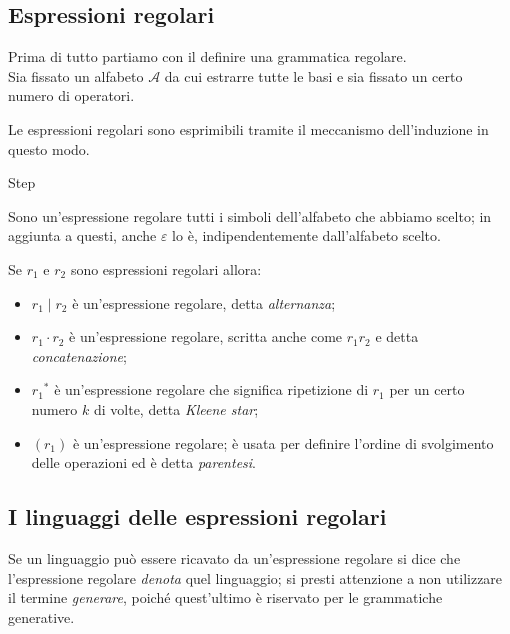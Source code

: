 \documentclass[class=book, crop=false, oneside, 12pt]{standalone}
\begin{document}
\subsection{Espressioni regolari}
Prima di tutto partiamo con il definire una grammatica regolare.\\
Sia fissato un alfabeto \(\mathcal{A}\) da cui estrarre tutte le basi e sia fissato un certo numero di operatori.

Le espressioni regolari sono esprimibili tramite il meccanismo dell'induzione in questo modo.
\begin{labeling}{Step}
    \item[Base] Sono un'espressione regolare tutti i simboli dell’alfabeto che abbiamo scelto; in aggiunta a questi, anche \(\varepsilon\) lo è, indipendentemente dall'alfabeto scelto.
    \item[Step] Se \(r_1\) e \(r_2\) sono espressioni regolari allora:
    \begin{itemize}
        \item \(r_1 \mid r_2\) è un’espressione regolare, detta \emph{alternanza};
        \item \(r_1 \cdot r_2\) è un’espressione regolare, scritta anche come \(r_1 r_2\) e detta \emph{concatenazione};
        \item \(r_1\)\(^\ast\) è un’espressione regolare che significa ripetizione di \(r_1\) per un certo numero \(k\) di volte, detta \emph{Kleene star};
        \item \((r_1)\) è un’espressione regolare; è usata per definire l’ordine di svolgimento delle operazioni ed è detta \emph{parentesi}.
    \end{itemize} 
\end{labeling}

\subsection{I linguaggi delle espressioni regolari}
Se un linguaggio può essere ricavato da un'espressione regolare si dice che l'espressione regolare \emph{denota} quel linguaggio; si presti attenzione a non utilizzare il termine \emph{generare}, poiché quest'ultimo è riservato per le grammatiche generative.
\end{document}
